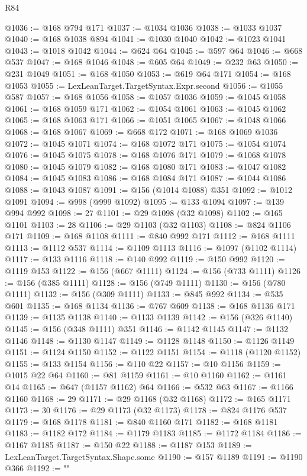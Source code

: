 \begin{lexlean}{R84}
\begin{coremodule}
@1036 := @168 @794 @171
@1037 := @1034 @1036
@1038 := @1033 @1037
@1040 := @168 @1038 @894
@1041 := @1030 @1040
@1042 := @1023 @1041
@1043 := @1018 @1042
@1044 := @624 @64
@1045 := @597 @64
@1046 := @668 @537
@1047 := @168 @1046
@1048 := @605 @64
@1049 := @232 @63
@1050 := @231 @1049
@1051 := @168 @1050
@1053 := @619 @64 @171
@1054 := @168 @1053
@1055 := LexLeanTarget.TargetSyntax.Expr.second
@1056 := @1055 @587
@1057 := @168 @1056
@1058 := @1057 @1036
@1059 := @1045 @1058
@1061 := @168 @1059 @171
@1062 := @1054 @1061
@1063 := @1045 @1062
@1065 := @168 @1063 @171
@1066 := @1051 @1065
@1067 := @1048 @1066
@1068 := @168 @1067
@1069 := @668 @172
@1071 := @168 @1069 @1036
@1072 := @1045 @1071
@1074 := @168 @1072 @171
@1075 := @1054 @1074
@1076 := @1045 @1075
@1078 := @168 @1076 @171
@1079 := @1068 @1078
@1080 := @1045 @1079
@1082 := @168 @1080 @171
@1083 := @1047 @1082
@1084 := @1045 @1083
@1086 := @168 @1084 @171
@1087 := @1044 @1086
@1088 := @1043 @1087
@1091 := @156 (@1014 @1088) @351
@1092 := @1012 @1091
@1094 := @998 (@999 @1092)
@1095 := @133 @1094
@1097 := @139 @994 @992
@1098 := 27
@1101 := @29 @1098 (@32 @1098)
@1102 := @165 @1101
@1103 := 28
@1106 := @29 @1103 (@32 @1103)
@1108 := @824 @1106 @171
@1109 := @168 @1108
@1111 := @840 @992 @171
@1112 := @168 @1111
@1113 := @1112 @537
@1114 := @1109 @1113
@1116 := @1097 (@1102 @1114)
@1117 := @133 @1116
@1118 := @140 @992
@1119 := @150 @992
@1120 := @1119 @153
@1122 := @156 (@667 @1111)
@1124 := @156 (@733 @1111)
@1126 := @156 (@385 @1111)
@1128 := @156 (@749 @1111)
@1130 := @156 (@780 @1111)
@1132 := @156 (@309 @1111)
@1133 := @845 @992
@1134 := @535 @601
@1135 := @168 @1134
@1136 := @767 @609
@1138 := @168 @1136 @171
@1139 := @1135 @1138
@1140 := @1133 @1139
@1142 := @156 (@326 @1140)
@1145 := @156 (@348 @1111) @351
@1146 := @1142 @1145
@1147 := @1132 @1146
@1148 := @1130 @1147
@1149 := @1128 @1148
@1150 := @1126 @1149
@1151 := @1124 @1150
@1152 := @1122 @1151
@1154 := @1118 (@1120 @1152)
@1155 := @133 @1154
@1156 := @110 @22
@1157 := @10 @1156
@1159 := @1015 @22 @64
@1160 := @81 @1159
@1161 := @10 @1160
@1162 := @1161 @14
@1165 := @647 (@1157 @1162) @64
@1166 := @532 @63
@1167 := @1166 @1160
@1168 := 29
@1171 := @29 @1168 (@32 @1168)
@1172 := @165 @1171
@1173 := 30
@1176 := @29 @1173 (@32 @1173)
@1178 := @824 @1176 @537
@1179 := @168 @1178
@1181 := @840 @1160 @171
@1182 := @168 @1181
@1183 := @1182 @172
@1184 := @1179 @1183
@1185 := @1172 @1184
@1186 := @1167 @1185
@1187 := @150 @22
@1188 := @1187 @153
@1189 := LexLeanTarget.TargetSyntax.Shape.some
@1190 := @157 @1189
@1191 := @1190 @366
@1192 := "{"
}
\end{coremodule}
\end{lexlean}
